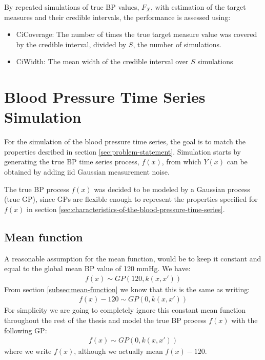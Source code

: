 By repeated simulations of true BP values, $F_X$, with estimation of the
target measures and their credible intervals, the performance is
assessed using:
\begin{itemize}
    \item CiCoverage: The number of times the true target
    measure value was covered by the credible interval, divided by
    $S$, the number of simulations.
    \item CiWidth: The mean width of the credible interval over $S$ simulations
\end{itemize}


\section{Blood Pressure Time Series Simulation}\label{sec:blood-pressure-time-series-simulation}
For the simulation of the blood pressure time series, the goal is to match the properties
desribed in section \ref{sec:problem-statement}.
Simulation starts by generating the true BP time series process, $f(x)$,
from which $Y(x)$ can be obtained by adding iid Gaussian measurement noise.

The true BP process $f(x)$ was decided to be modeled by a Gaussian process
(true GP),
since GPs are flexible enough to represent the properties
specified for $f(x)$ in section \ref{sec:characteristics-of-the-blood-pressure-time-series}.

\subsection{Mean function}
A reasonable assumption for the mean function, would be to keep it constant and
equal to the global mean BP value of 120 mmHg. We have:
\begin{gather*}
    f(x) \sim GP(120, k(x,x'))
\end{gather*}
From section \ref{subsec:mean-function} we know that this is the same as writing:
\begin{gather*}
    f(x) - 120 \sim GP(0, k(x,x'))
\end{gather*}
For simplicity we are going to completely ignore this constant
mean function throughout the rest of the thesis and
model the true BP process $f(x)$ with the following
GP:
\begin{gather*}
    f(x) \sim GP(0, k(x,x'))
\end{gather*}
where we write $f(x)$, although we actually mean $f(x) - 120$.


